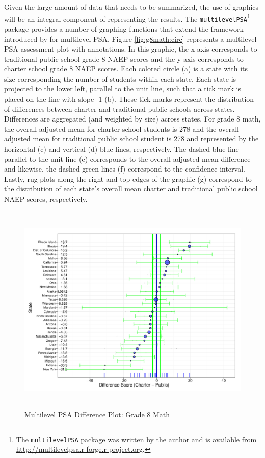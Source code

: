 \documentclass[letterpaper,12pt]{article}
\begin{document}
Given the large amount of data that needs to be summarized, the use of graphics will be an integral component of representing the results. The \texttt{multilevelPSA}\footnote{The \texttt{multilevelPSA} package was written by the author and is available from \url{http://multilevelpsa.r-forge.r-project.org}.} package provides a number of graphing functions that extend the framework introduced by  for multilevel PSA. Figure \ref{fig:g8math:circ} represents a multilevel PSA assessment plot with annotations. In this graphic, the x-axis corresponds to traditional public school grade 8 NAEP scores and the y-axis corresponds to charter school grade 8 NAEP scores. Each colored circle (a) is a state with its size corresponding the number of students within each state. Each state is projected to the lower left, parallel to the unit line, such that a tick mark is placed on the line with slope -1 (b). These tick marks represent the distribution of differences between charter and traditional public schools across states. Differences are aggregated (and weighted by size) across states. For grade 8 math, the overall adjusted mean for charter school students is 278 and the overall adjusted mean for traditional public school student is 278 and represented by the horizontal (c) and vertical (d) blue lines, respectively. The dashed blue line parallel to the unit line (e) corresponds to the overall adjusted mean difference and likewise, the dashed green lines (f) correspond to the confidence interval. Lastly, rug plots along the right and top edges of the graphic (g) correspond to the distribution of each state's overall mean charter and traditional public school NAEP scores, respectively.

\begin{figure}[t]
\begin{center}
\includegraphics[height=4in]{../Figures/g8mathlrdiffplot.pdf}
\caption{Multilevel PSA Difference Plot: Grade 8 Math}
\label{fig:g8math:diff}
\end{center}
\end{figure}
\end{document}
